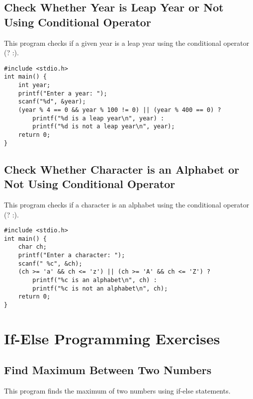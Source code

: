\documentclass[a4paper,12pt]{article}
\begin{document}
\newpage

\subsection{Check Whether Year is Leap Year or Not Using Conditional Operator}
This program checks if a given year is a leap year using the conditional operator (? :).

\begin{lstlisting}[caption={Check Whether Year is Leap Year or Not Using Conditional Operator}]
#include <stdio.h>
int main() {
    int year;
    printf("Enter a year: ");
    scanf("%d", &year);
    (year % 4 == 0 && year % 100 != 0) || (year % 400 == 0) ?
        printf("%d is a leap year\n", year) :
        printf("%d is not a leap year\n", year);
    return 0;
}
\end{lstlisting}

\newpage

\subsection{Check Whether Character is an Alphabet or Not Using Conditional Operator}
This program checks if a character is an alphabet using the conditional operator (? :).

\begin{lstlisting}[caption={Check Whether Character is an Alphabet or Not Using Conditional Operator}]
#include <stdio.h>
int main() {
    char ch;
    printf("Enter a character: ");
    scanf(" %c", &ch);
    (ch >= 'a' && ch <= 'z') || (ch >= 'A' && ch <= 'Z') ?
        printf("%c is an alphabet\n", ch) :
        printf("%c is not an alphabet\n", ch);
    return 0;
}
\end{lstlisting}

\newpage

\section{If-Else Programming Exercises}

\subsection{Find Maximum Between Two Numbers}
This program finds the maximum of two numbers using if-else statements.
\end{document}
